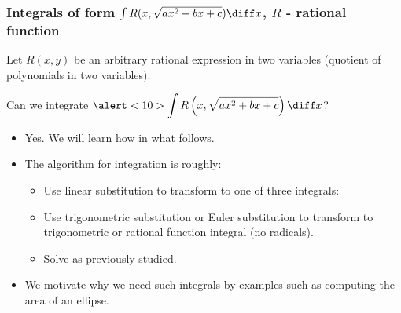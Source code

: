 \begin{frame}
\frametitle{Integrals of form $\int R(x,\sqrt{ax^2+bx+c}) \diff x$, $R$ - rational function}
Let $R(x,y)$ be an arbitrary rational expression in two variables (quotient of polynomials in two variables).
\begin{question}
Can we integrate $\alert<10>{\displaystyle\int R\left(x,\sqrt{ax^2+bx+c} \right) \diff x}$?
\end{question}
\begin{itemize}
\item<2-> Yes. We will learn how in what follows.
\item<3-> The algorithm for integration is roughly:
\begin{itemize}
\item<4-> Use linear substitution to transform to one of three integrals: 
  
\item<8-> Use trigonometric substitution or Euler substitution to transform to trigonometric or rational function integral (no radicals).
\item<9-> Solve as previously studied.
\end{itemize}
\item<10-> We motivate why we need \alert<10>{such integrals } by examples such as computing the area of an ellipse.
\end{itemize}
\end{frame}
